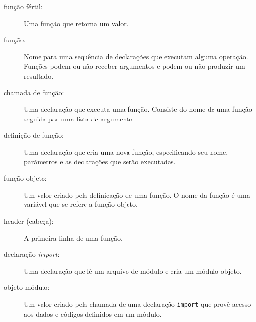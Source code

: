 \begin{description}
\item[função fértil:] Uma função que retorna um valor.

\item[função:] Nome para uma sequência de declarações que executam alguma
operação. Funções podem ou não receber argumentos e podem ou não produzir um
resultado.

\item[chamada de função:] Uma declaração que executa uma função. Consiste do
nome de uma função seguida por uma lista de argumento.

\item[definição de função:] Uma declaração que cria uma nova função,
especificando seu nome, parâmetros e as declarações que serão executadas.

\item[função objeto:] Um valor criado pela definicação de uma função. O nome
da função é uma variável que se refere a função objeto.

\item[header (cabeça):] A primeira linha de uma função.

\item[declaração {\it import}:] Uma declaração que lê um arquivo de módulo e
cria um módulo objeto.

\item[objeto módulo:] Um valor criado pela chamada de uma declaração {\tt import}
que provê acesso aos dados e códigos definidos em um módulo.


\end{description}
